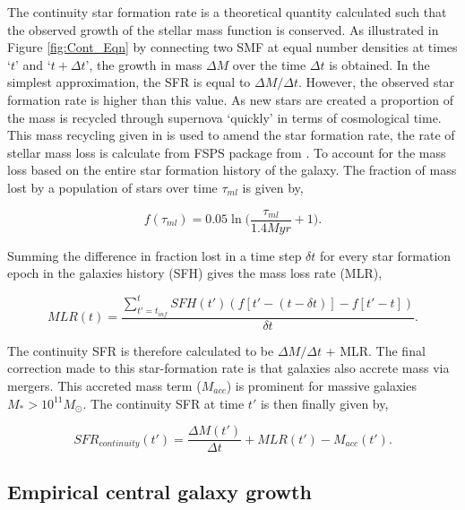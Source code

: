The continuity star formation rate is a theoretical quantity calculated such that the observed growth of the stellar mass function is conserved. As illustrated in Figure \ref{fig:Cont_Eqn} by connecting two SMF at equal number densities at times `$t$' and `$t + \Delta t$', the growth in mass $\Delta M$ over the time $\Delta t$ is obtained. In the simplest approximation, the SFR is equal to $\Delta M / \Delta t$. However, the observed star formation rate is higher than this value. As new stars are created a proportion of the mass is recycled through supernova `quickly' in terms of cosmological time. This mass recycling given in \citet{Moster2018Emerge10} is used to amend the star formation rate, the rate of stellar mass loss is calculate from FSPS package from \citet{Conroy2010FSPS:Synthesis, Conroy2010TheObservations}.
To account for the mass loss based on the entire star formation history of the galaxy. The fraction of mass lost by a population of stars over time $\tau_{ml}$ is given by,

\begin{equation}
\label{eqn:f_ml}
f(\tau_{ml}) = 0.05 \ln \Big(\frac{\tau_{ml}}{1.4 Myr}+1\Big).
\end{equation}

Summing the difference in fraction lost in a time step $\delta t$ for every star formation epoch in the galaxies history (SFH) gives the mass loss rate (MLR), 

\begin{equation}
\label{eqn:MLR}
MLR(t) = \frac{ \sum_{t' = t_{inf}}^{t} SFH(t')(f[t' - (t-\delta t)]-f[t' - t]) }{\delta t}.
\end{equation}

The continuity SFR is therefore calculated to be $\Delta M / \Delta t$ + MLR. The final correction made to this star-formation rate is that galaxies also accrete mass via mergers. This accreted mass term ($M_{acc}$) is prominent for massive galaxies $M_* > 10^{11} M_{\odot}$. The continuity SFR at time $t'$ is then finally given by,

\begin{equation}
    SFR_{continuity}(t') = \frac{\Delta M(t')}{\Delta t} + MLR(t') - M_{acc}(t').
\end{equation}

\subsection{Empirical central galaxy growth}


